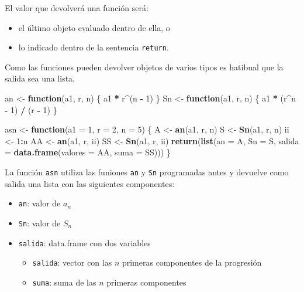 \documentclass[]{book}
\newenvironment{Shaded}{\begin{snugshade}}{\end{snugshade}}
\newcommand{\ControlFlowTok}[1]{\textcolor[rgb]{0.13,0.29,0.53}{\textbf{#1}}}
\newcommand{\DataTypeTok}[1]{\textcolor[rgb]{0.13,0.29,0.53}{#1}}
\newcommand{\DecValTok}[1]{\textcolor[rgb]{0.00,0.00,0.81}{#1}}
\newcommand{\KeywordTok}[1]{\textcolor[rgb]{0.13,0.29,0.53}{\textbf{#1}}}
\newcommand{\NormalTok}[1]{#1}
\newcommand{\OperatorTok}[1]{\textcolor[rgb]{0.81,0.36,0.00}{\textbf{#1}}}
\newcommand{\StringTok}[1]{\textcolor[rgb]{0.31,0.60,0.02}{#1}}
\providecommand{\tightlist}{%
  \setlength{\itemsep}{0pt}\setlength{\parskip}{0pt}}
\begin{document}
El valor que devolverá una función será:

\begin{itemize}
\item
  el último objeto evaluado dentro de ella, o
\item
  lo indicado dentro de la sentencia \texttt{return}.
\end{itemize}

Como las funciones pueden devolver objetos de varios tipos es hatibual
que la salida sea una lista.

\begin{Shaded}
\begin{Highlighting}[]
\NormalTok{an <-}\StringTok{ }\ControlFlowTok{function}\NormalTok{(a1, r, n) \{ a1 }\OperatorTok{*}\StringTok{ }\NormalTok{r}\OperatorTok{^}\NormalTok{(n }\OperatorTok{-}\StringTok{ }\DecValTok{1}\NormalTok{) \}}
\NormalTok{Sn <-}\StringTok{ }\ControlFlowTok{function}\NormalTok{(a1, r, n) \{ a1 }\OperatorTok{*}\StringTok{ }\NormalTok{(r}\OperatorTok{^}\NormalTok{n }\OperatorTok{-}\StringTok{ }\DecValTok{1}\NormalTok{) }\OperatorTok{/}\StringTok{ }\NormalTok{(r }\OperatorTok{-}\StringTok{ }\DecValTok{1}\NormalTok{) \}}
  
\NormalTok{asn <-}\StringTok{ }\ControlFlowTok{function}\NormalTok{(}\DataTypeTok{a1 =} \DecValTok{1}\NormalTok{, }\DataTypeTok{r =} \DecValTok{2}\NormalTok{, }\DataTypeTok{n =} \DecValTok{5}\NormalTok{) \{}
\NormalTok{  A <-}\StringTok{ }\KeywordTok{an}\NormalTok{(a1, r, n)}
\NormalTok{  S <-}\StringTok{ }\KeywordTok{Sn}\NormalTok{(a1, r, n)}
\NormalTok{  ii <-}\StringTok{ }\DecValTok{1}\OperatorTok{:}\NormalTok{n}
\NormalTok{  AA <-}\StringTok{ }\KeywordTok{an}\NormalTok{(a1, r, ii)}
\NormalTok{  SS <-}\StringTok{ }\KeywordTok{Sn}\NormalTok{(a1, r, ii)}
  \KeywordTok{return}\NormalTok{(}\KeywordTok{list}\NormalTok{(}\DataTypeTok{an =}\NormalTok{ A, }\DataTypeTok{Sn =}\NormalTok{ S, }\DataTypeTok{salida =} \KeywordTok{data.frame}\NormalTok{(}\DataTypeTok{valores =}\NormalTok{ AA, }\DataTypeTok{suma =}\NormalTok{ SS)))}
\NormalTok{\}}
\end{Highlighting}
\end{Shaded}

La función \texttt{asn} utiliza las funiones \texttt{an} y \texttt{Sn}
programadas antes y devuelve como salida una lista con las siguientes
componentes:

\begin{itemize}
\tightlist
\item
  \texttt{an}: valor de \(a_n\)
\item
  \texttt{Sn}: valor de \(S_n\)
\item
  \texttt{salida}: data.frame con dos variables

  \begin{itemize}
  \tightlist
  \item
    \texttt{salida}: vector con las \(n\) primeras componentes de la
    progresión
  \item
    \texttt{suma}: suma de las \(n\) primeras componentes
  \end{itemize}
\end{itemize}
\end{document}
